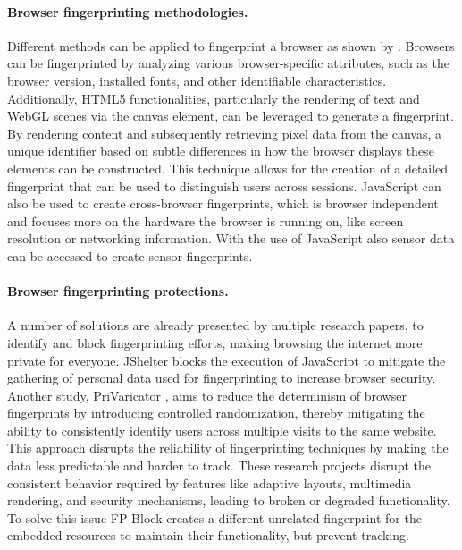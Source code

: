 \documentclass[11pt,
  oneside,openany,    %
]{scrreprt}
\begin{document}
\paragraph{Browser fingerprinting methodologies.}
\label{par:browser_fingerprint}
Different methods can be applied to fingerprint a browser as shown by \citeauthor{DBLP:conf/ntms/UpathilakeLM15} \cite{DBLP:conf/ntms/UpathilakeLM15}.
Browsers can be fingerprinted by analyzing various browser-specific attributes, such as the browser version, installed fonts, and other identifiable characteristics.
Additionally, HTML5 functionalities, particularly the rendering of text and WebGL scenes via the canvas element, can be leveraged to generate a fingerprint.
By rendering content and subsequently retrieving pixel data from the canvas, a unique identifier based on subtle differences in how the browser displays these elements can be constructed.
This technique allows for the creation of a detailed fingerprint that can be used to distinguish users across sessions.
JavaScript can also be used to create cross-browser fingerprints, which is browser independent and focuses more on the hardware the browser is running on, like screen resolution or networking information.
With the use of JavaScript also sensor data can be accessed to create sensor fingerprints.

\paragraph{Browser fingerprinting protections.}
\label{par:browser_fingerprint_protect}
A number of solutions are already presented by multiple research papers, to identify and block fingerprinting efforts, making browsing the internet more private for everyone. 
JShelter \cite{DBLP:conf/secrypt/PolcakSMHM23} blocks the execution of JavaScript to mitigate the gathering of personal data used for fingerprinting to increase browser security.
Another study, PriVaricator \cite{DBLP:conf/www/NikiforakisJL15}, aims to reduce the determinism of browser fingerprints by introducing controlled randomization, thereby mitigating the ability to consistently identify users across multiple visits to the same website.
This approach disrupts the reliability of fingerprinting techniques by making the data less predictable and harder to track.
These research projects disrupt the consistent behavior required by features like adaptive layouts, multimedia rendering, and security mechanisms, leading to broken or degraded functionality. 
To solve this issue FP-Block \cite{DBLP:conf/esorics/TorresJM15} creates a different unrelated fingerprint for the embedded resources to maintain their functionality, but prevent tracking.
\end{document}
